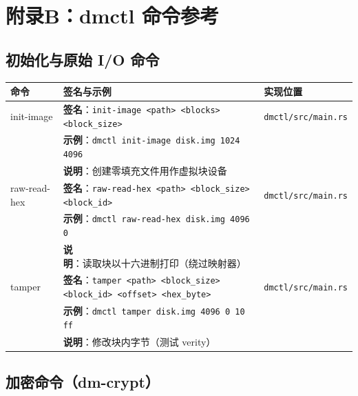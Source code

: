 \chapter{附录B：dmctl 命令参考}
\label{app:commands}

\section*{初始化与原始 I/O 命令}

\begin{longtable}{|p{}|p{}|p{}|}
\hline
\textbf{命令} & \textbf{签名与示例} & \textbf{实现位置} \\
\hline
\endhead
init-image & \textbf{签名}：\texttt{init-image <path> <blocks> <block\_size>} & \texttt{dmctl/src/main.rs} \\
 & \textbf{示例}：\texttt{dmctl init-image disk.img 1024 4096} & \\
 & \textbf{说明}：创建零填充文件用作虚拟块设备 & \\
\hline
raw-read-hex & \textbf{签名}：\texttt{raw-read-hex <path> <block\_size> <block\_id>} & \texttt{dmctl/src/main.rs} \\
 & \textbf{示例}：\texttt{dmctl raw-read-hex disk.img 4096 0} & \\
 & \textbf{说明}：读取块以十六进制打印（绕过映射器） & \\
\hline
tamper & \textbf{签名}：\texttt{tamper <path> <block\_size> <block\_id> <offset> <hex\_byte>} & \texttt{dmctl/src/main.rs} \\
 & \textbf{示例}：\texttt{dmctl tamper disk.img 4096 0 10 ff} & \\
 & \textbf{说明}：修改块内字节（测试 verity） & \\
\hline
\end{longtable}

\section*{加密命令（dm-crypt）}

